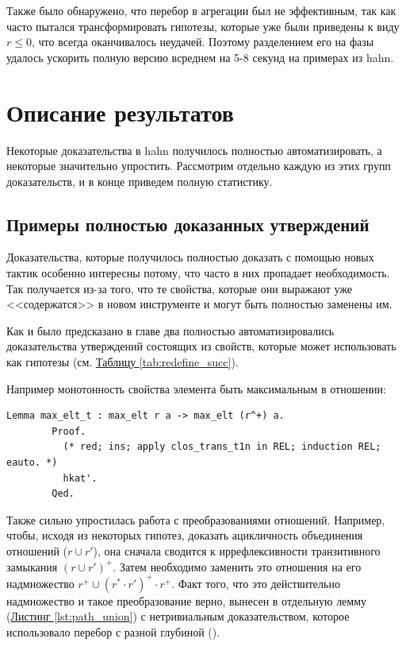 \documentclass[times
              ]{itmo-student-thesis}
\begin{document}
      Также было обнаружено, что перебор в агрегации был не эффективным, так как часто пытался
      трансформировать гипотезы, которые уже были приведены к виду $r \le 0$, что всегда оканчивалось
      неудачей. Поэтому разделением его на фазы удалось ускорить полную версию  всреднем на
      5-8 секунд на примерах из hahn.


  \section{Описание результатов}

    Некоторые доказательства в hahn получилось полностью автоматизировать, а некоторые значительно
    упростить. Рассмотрим отдельно каждую из этих групп доказательств, и в конце приведем полную
    статистику.
  
    \subsection{Примеры полностью доказанных утверждений}

      Доказательства, которые получилось полностью доказать с помощью новых тактик особенно интересны
      потому, что часто в них пропадает необходимость. Так получается из-за того, что те свойства,
      которые они выражают уже <<содержатся>> в новом инструменте и могут быть полностью заменены им.  

      Как и было предсказано в главе два полностью автоматизировались доказательства утверждений
      состоящих из свойств, которые  может использовать как гипотезы
      (см. \hyperref[tab:redefine_succ]{Таблицу \ref{tab:redefine_succ}}).

      Например монотонность свойства элемента быть максимальным в отношении:
      \begin{lstlisting}[float=false, language=Coq, gobble=8]
        Lemma max_elt_t : max_elt r a -> max_elt (r^+) a.
        Proof.
          (* red; ins; apply clos_trans_t1n in REL; induction REL; eauto. *)
          hkat'.
        Qed.
      \end{lstlisting}

      Также сильно упростилась работа с преобразованиями отношений.
      Например, чтобы, исходя из некоторых гипотез, доказать ацикличность объединения
      отношений ($r \cup r'$), она сначала сводится к иррефлексивности транзитивного замыкания
      $(r \cup r')^+$.
      Затем необходимо заменить это отношения на его надмножество $r^+ \cup (r^* \cdot r')^+ \cdot r^+$.
      Факт того, что это действительно надмножество и такое преобразование
      верно, вынесен в отдельную лемму  (\hyperref[lst:path_union]{Листинг \ref{lst:path_union}})
      с нетривиальным доказательством, которое использовало перебор с разной глубиной
      ().
\end{document}
